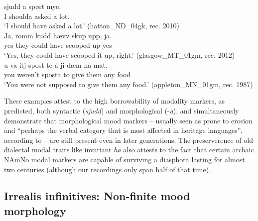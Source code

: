 \documentclass[output=paper]{langscibook}
\begin{document}
\ea%
    \label{ex:eide:9}
    \ea \label{ex:eide:9a} 
    \gll [E] sjudd a spørt mye.          \\
         I shoulda {} asked {a lot}.          \\
    \glt ‘I should have asked a lot.’ ({{hatton\_ND\_04gk}}, rec. 2010)\\
    \ex \label{ex:eide:9b} 
    \gll Ja, romm kudd hævv skup upp, ja.       \\
         yes they could have scooped up yes       \\
    \glt ‘Yes, they could have scooped it up, right.’ ({{glasgow\_MT\_01gm}}, rec. 2012)\\
    \ex \label{ex:eide:9c} 
    \gll [D]u {va itj} spost {te å} ji dæm nå mat.       \\
         you weren’t sposta to give them any food    \\
    \glt ‘You were not supposed to give them any food.’ ({{appleton\_MN\_01gm}}, rec. 1987)\\ 
    \z %
\z

These examples attest to the high borrowability of modality markers, as predicted, both syntactic (\textit{sjudd}) and morphological (-\textit{a}), and simultaneously demonstrate that morphological mood markers – usually seen as prone to erosion and “perhaps the verbal category that is most affected in heritage languages”, according to \citet{Montrul2016} – are still present even in later generations. The preserverence of old dialectal modal traits like invariant \textit{ha} also attests to the fact that certain archaic NAmNo modal markers are capable of surviving a diasphora lasting for almost two centuries (although our recordings only span half of that time). 

\subsection{Irrealis infinitives: Non-finite mood morphology} \label{subsect_irrrealis}
\largerpage[2]
\end{document}

